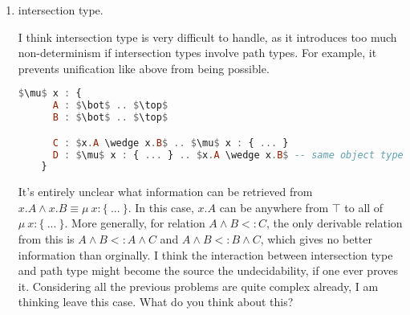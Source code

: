 \documentclass{article}
\begin{document}
\begin{enumerate}
\item intersection type.

  I think intersection type is very difficult to handle, as it introduces too much
  non-determinism if intersection types involve path types. For example, it prevents
  unification like above from being possible.
  
  \nolinenumbers
  \begin{lstlisting}[language=Haskell, mathescape=true]
    $\mu$ x : {
      A : $\bot$ .. $\top$
      B : $\bot$ .. $\top$

      C : $x.A \wedge x.B$ .. $\mu$ x : { ... }
      D : $\mu$ x : { ... } .. $x.A \wedge x.B$ -- same object type as above
    }
  \end{lstlisting}

  \linenumbers
  It's entirely unclear what information can be retrieved from
  $x.A \wedge x.B \equiv \mu\ x : \{\ ...\ \}$. In this case, $x.A$ can be anywhere
  from $\top$ to all of $\mu\ x:\{\ ...\ \}$. More generally, for relation
  $A \wedge B <: C$, the only derivable relation from this is
  $A \wedge B <: A \wedge C$ and $A \wedge B <: B \wedge C$, which gives no better
  information than orginally. I think the interaction between intersection type and
  path type might become the source the undecidability, if one ever proves
  it. Considering all the previous problems are quite complex already, I am thinking
  leave this case. What do you think about this?
\end{enumerate}
\end{document}
